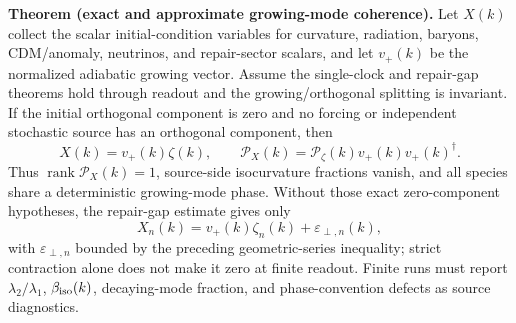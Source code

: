 \textbf{Theorem (exact and approximate growing-mode coherence).}\label{thm:oph-growing-mode-coherence}
Let \(X(k)\) collect the scalar initial-condition variables for curvature,
radiation, baryons, CDM/anomaly, neutrinos, and repair-sector scalars, and let
\(v_+(k)\) be the normalized adiabatic growing vector. Assume the single-clock
and repair-gap theorems hold through readout and the growing/orthogonal
splitting is invariant. If the initial orthogonal component is zero and no
forcing or independent stochastic source has an orthogonal component, then
\[
X(k)=v_+(k)\zeta(k),
\qquad
\mathcal P_X(k)=\mathcal P_\zeta(k)v_+(k)v_+(k)^\dagger .
\]
Thus \(\operatorname{rank}\mathcal P_X(k)=1\), source-side isocurvature
fractions vanish, and all species share a deterministic growing-mode phase.
Without those exact zero-component hypotheses, the repair-gap estimate gives
only
\[
X_n(k)=v_+(k)\zeta_n(k)+\varepsilon_{\perp,n}(k),
\]
with \(\varepsilon_{\perp,n}\) bounded by the preceding geometric-series
inequality; strict contraction alone does not make it zero at finite readout.
Finite runs must report \(\lambda_2/\lambda_1\), \(\beta_{\rm iso}(k)\),
decaying-mode fraction, and phase-convention defects as source diagnostics.

